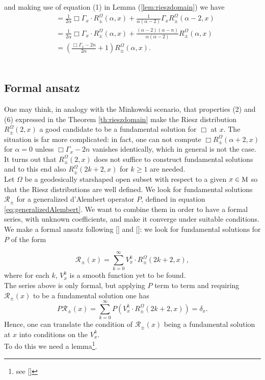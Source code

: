 and making use of equation (1) in Lemma (\ref{lem:rieszdomain}) we have
\[	\begin{aligned}
&=\frac{1}{2\alpha}\Box\Gamma_x\cdot R_\pm^\Omega(\alpha,x)+\frac{1}{\alpha(\alpha-2)}\Gamma_x R_\pm^\Omega(\alpha-2,x)\\
&=\frac{1}{2\alpha}\Box\Gamma_x\cdot R_\pm^\Omega(\alpha,x)+\frac{(\alpha-2)(\alpha-n)}{\alpha(\alpha-2)} R_\pm^\Omega(\alpha,x)\\
&=\left(\frac{\Box\Gamma_x-2n}{2\alpha}+1\right)R_\pm^\Omega(\alpha,x).
\end{aligned}		\]
\endproof\\

\subsection{Formal ansatz}
One may think, in analogy with the Minkowski scenario, that properties (2) and (6) expressed in the Theorem \ref{th:rieszdomain} make the Riesz distribution $R_\pm^\Omega(2,x)$ a good candidate to be a fundamental solution for $\Box$ at $x$. The situation is far more complicated: in fact, one can not compute $\Box R_\pm^\Omega(\alpha+2,x)$ for $\alpha=0$ unless $\Box\Gamma_x-2n$ vanishes identically, which in general is not the case.\\
It turns out that $R_\pm^\Omega(2,x)$ does not suffice to construct fundamental solutions and to this end also $R_\pm^\Omega(2k+2,x)$ for $k\geq 1$ are needed.\\

\noindent Let $\Omega$ be a geodesically starshaped open subset with respect to a given $x\in\mathrm{M}$ so that the Riesz distributions are well defined. We look for fundamental solutions $\mathcal{R}_\pm$ for a generalized d'Alembert operator $P$, defined in equation \eqref{eq:generalizedAlembert}. We want to combine them in order to have a formal series, with unknown coefficients, and make it converge under suitable conditions.
We make a formal ansatz following [\citealp{ginoux}] and [\citealp[Sec 2.2.1]{bar2}]: we look for fundamental solutions for $P$ of the form

\begin{equation}
	\mathcal{R}_\pm(x)=\sum_{k=0}^{\infty} V_x^k\cdot R_\pm^\Omega(2k+2,x),
	\label{eq:formalseries}
\end{equation}
where for each $k$, $V_x^k$ is a smooth function yet to be found.\\

\noindent The series above is only formal, but applying $P$ term to term and requiring $\mathcal{R}_\pm(x)$ to be a fundamental solution one has 
\[	P\mathcal{R}_\pm(x)=\sum_{k=0}^{\infty} P\left(V_x^k\cdot R_\pm^\Omega(2k+2,x)\right)=\delta_x.	\]
Hence, one can translate the condition of $\mathcal{R}_\pm(x)$ being a fundamental solution at $x$ into conditions on the $V_x^k$.\\
To do this we need a lemma\footnote{see [\citealp[Lem 2.1.9]{bar2}]}.

